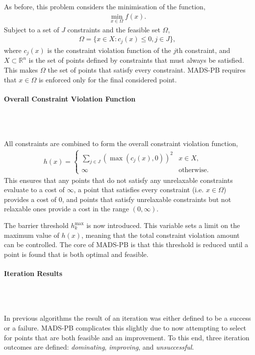 As before, this problem considers the minimisation of the function,
\begin{gather}
    \min_{x\in\Omega} f(x).
\end{gather}
Subject to a set of $J$ constraints and the feasible set $\Omega$,
\begin{gather}
    \Omega = \{x\in X: c_j(x) \leq 0, j\in J\},
\end{gather}
where $c_j(x)$ is the constraint violation function of the $j$th constraint, and $X\subset \mathbb{R}^n$ is the set of points defined by constraints that must always be satisfied. This makes $\Omega$ the set of points that satisfy every constraint. \ac{MADS-PB} requires that $x\in\Omega$ is enforced only for the final considered point.

\paragraph{Overall Constraint Violation Function}\\\

All constraints are combined to form the overall constraint violation function,
\begin{gather}
    h(x) = 
    \begin{cases} \label{eqn:progressive_barrier_constraint}
    \sum\limits_{j\in J}(\max(c_j(x),0))^2 & x\in X,\\
    \infty & \text{otherwise}.
    \end{cases}
\end{gather}
This ensures that any points that do not satisfy any unrelaxable constraints evaluate to a cost of $\infty$, a point that satisfies every constraint (i.e. $x\in \Omega$) provides a cost of $0$, and points that satisfy unrelaxable constraints but not relaxable ones provide a cost in the range $(0,\infty)$.

The barrier threshold $h_k^{\max}$ is now introduced. This variable sets a limit on the maximum value of $h(x)$, meaning that the total constraint violation amount can be controlled. The core of \ac{MADS-PB} is that this threshold is reduced until a point is found that is both optimal and feasible.

\paragraph{Iteration Results}\\\

In previous algorithms the result of an iteration was either defined to be a success or a failure. \ac{MADS-PB} complicates this slightly due to now attempting to select for points that are both feasible and an improvement. To this end, three iteration outcomes are defined: \textit{dominating}, \textit{improving}, and \textit{unsuccessful}.

